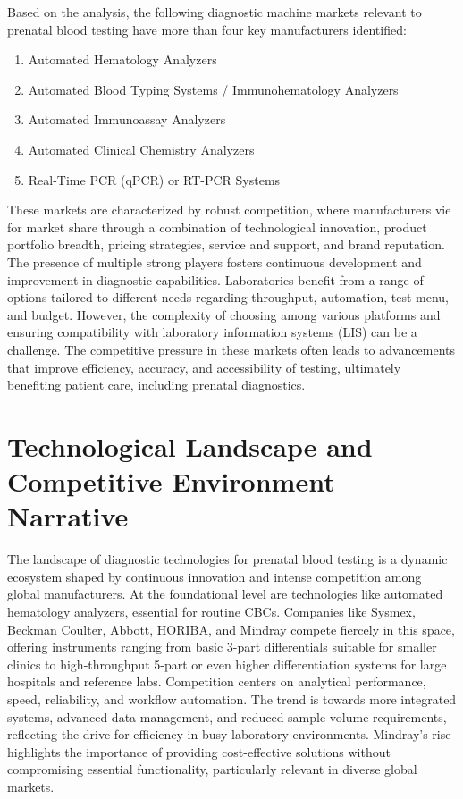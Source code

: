 \documentclass{article}
\begin{document}
Based on the analysis, the following diagnostic machine markets relevant to prenatal blood testing have more than four key manufacturers identified:
\begin{enumerate}
    \item Automated Hematology Analyzers
    \item Automated Blood Typing Systems / Immunohematology Analyzers
    \item Automated Immunoassay Analyzers
    \item Automated Clinical Chemistry Analyzers
    \item Real-Time PCR (qPCR) or RT-PCR Systems
\end{enumerate}
These markets are characterized by robust competition, where manufacturers vie for market share through a combination of technological innovation, product portfolio breadth, pricing strategies, service and support, and brand reputation. The presence of multiple strong players fosters continuous development and improvement in diagnostic capabilities. Laboratories benefit from a range of options tailored to different needs regarding throughput, automation, test menu, and budget. However, the complexity of choosing among various platforms and ensuring compatibility with laboratory information systems (LIS) can be a challenge. The competitive pressure in these markets often leads to advancements that improve efficiency, accuracy, and accessibility of testing, ultimately benefiting patient care, including prenatal diagnostics.

\section{Technological Landscape and Competitive Environment Narrative}

The landscape of diagnostic technologies for prenatal blood testing is a dynamic ecosystem shaped by continuous innovation and intense competition among global manufacturers. At the foundational level are technologies like automated hematology analyzers, essential for routine CBCs. Companies like Sysmex, Beckman Coulter, Abbott, HORIBA, and Mindray compete fiercely in this space, offering instruments ranging from basic 3-part differentials suitable for smaller clinics to high-throughput 5-part or even higher differentiation systems for large hospitals and reference labs. Competition centers on analytical performance, speed, reliability, and workflow automation. The trend is towards more integrated systems, advanced data management, and reduced sample volume requirements, reflecting the drive for efficiency in busy laboratory environments. Mindray's rise highlights the importance of providing cost-effective solutions without compromising essential functionality, particularly relevant in diverse global markets.
\end{document}
